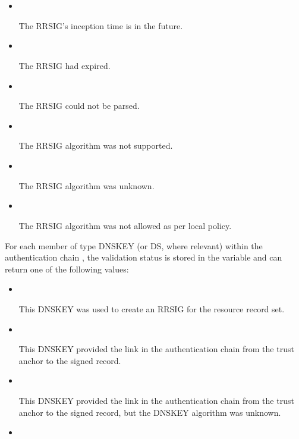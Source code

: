 \begin{description}
\begin{description}
\begin{itemize}
\item {}\verb" "

The RRSIG's inception time is in the future.

\item {}\verb" "

The RRSIG had expired.

\item {}\verb" "

The RRSIG could not be parsed.

\item {}\verb" "

The RRSIG algorithm was not supported.

\item {}\verb" "

The RRSIG algorithm was unknown.

\item {}\verb" "

The RRSIG algorithm was not allowed as per local policy.

\end{itemize}

For each  member of type DNSKEY (or DS, where relevant) within the
authentication chain , the validation status is stored in
the variable  and can return one of the following values:

\begin{itemize}

\item {}\verb" "

This DNSKEY was used to create an RRSIG for the resource record set.

\item {}\verb" "

This DNSKEY provided the link in the authentication chain from the trust
anchor to the signed record.

\item {}\verb" "

This DNSKEY provided the link in the authentication chain from the trust
anchor to the signed record, but the DNSKEY algorithm was unknown.

\item {}\verb" "


\end{itemize}
\end{description}
\end{description}
